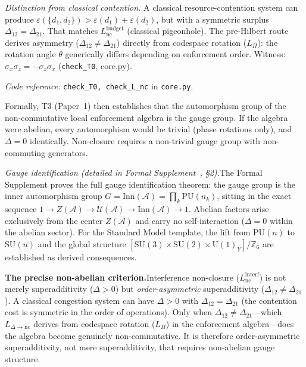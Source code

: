 \documentclass[11pt]{article}
\newcommand{\coderef}[2]{\smallskip\noindent\textit{Code reference:} \texttt{#1} in \texttt{#2}.}
\newcommand{\SU}{\mathrm{SU}}
\newcommand{\U}{\mathrm{U}}
\begin{document}
\begin{tcolorbox}[apfbox, title={Lemma $L_{\Delta\to\mathrm{nc}}$ (Interference Non-Closure Implies Non-Commutativity)}]
\smallskip\noindent\textit{Distinction from classical contention.}  A classical resource-contention system can produce $\varepsilon(\{d_1,d_2\}) > \varepsilon(d_1) + \varepsilon(d_2)$, but with a symmetric surplus $\Delta_{12} = \Delta_{21}$.  That matches $L_{\mathrm{nc}}^{\mathrm{budget}}$ (classical pigeonhole).  The pre-Hilbert route derives asymmetry ($\Delta_{12} \ne \Delta_{21}$) directly from codespace rotation ($L_\Pi$): the rotation angle $\theta$ generically differs depending on enforcement order.  Witness: $\sigma_x \sigma_z = -\sigma_z \sigma_x$ (\texttt{check\_T0}, core.py).

\coderef{check\_T0, check\_L\_nc}{core.py}
\end{tcolorbox}

Formally, T3 (Paper~1) then establishes that the automorphism group of the non-commutative local enforcement algebra is the gauge group.  If the algebra were abelian, every automorphism would be trivial (phase rotations only), and $\Delta = 0$ identically.  Non-closure requires a non-trivial gauge group with non-commuting generators.

\smallskip\noindent\textit{Gauge identification (detailed in Formal Supplement~\cite{BrookeP2Supplement}, \S2).}\quad The Formal Supplement proves the full gauge identification theorem: the gauge group is the inner automorphism group $G = \mathrm{Inn}(\mathcal{A}) = \prod_k \mathrm{PU}(n_k)$, sitting in the exact sequence $1 \to Z(\mathcal{A}) \to \mathcal{U}(\mathcal{A}) \to \mathrm{Inn}(\mathcal{A}) \to 1$.  Abelian factors arise exclusively from the center $Z(\mathcal{A})$ and carry no self-interaction ($\Delta = 0$ within the abelian sector).  For the Standard Model template, the lift from $\mathrm{PU}(n)$ to $\SU(n)$ and the global structure $[\SU(3) \times \SU(2) \times \U(1)_Y]/\mathbb{Z}_6$ are established as derived consequences.

\smallskip
\noindent\textbf{The precise non-abelian criterion.}\quad Interference non-closure ($L_{\mathrm{nc}}^{\mathrm{interf}}$) is not merely superadditivity ($\Delta > 0$) but \emph{order-asymmetric} superadditivity ($\Delta_{12} \ne \Delta_{21}$).  A classical congestion system can have $\Delta > 0$ with $\Delta_{12} = \Delta_{21}$ (the contention cost is symmetric in the order of operations).  Only when $\Delta_{12} \ne \Delta_{21}$---which $L_{\Delta\to\mathrm{nc}}$ derives from codespace rotation ($L_\Pi$) in the enforcement algebra---does the algebra become genuinely non-commutative.  It is therefore order-asymmetric superadditivity, not mere superadditivity, that requires non-abelian gauge structure.
\end{document}
